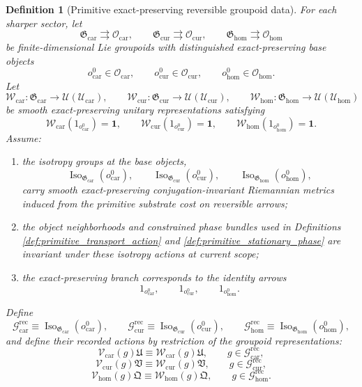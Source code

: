 \documentclass[11pt]{article}
\newcommand{\RootTensorClass}{\mathscr U_{\mathrm{car}}}
\newcommand{\RootRelabelClass}{\mathscr U_{\mathrm{cur}}}
\newcommand{\RootFreeClass}{\mathscr U_{\mathrm{hom}}}
\newcommand{\RootTensor}{\mathfrak U}
\newcommand{\RootRelabel}{\mathfrak V}
\newcommand{\RootFree}{\mathfrak Q}
\newcommand{\TensorReconGroup}{\mathcal G_{\mathrm{car}}^{\mathrm{rec}}}
\newcommand{\CurReconGroup}{\mathcal G_{\mathrm{cur}}^{\mathrm{rec}}}
\newcommand{\HomReconGroup}{\mathcal G_{\mathrm{hom}}^{\mathrm{rec}}}
\newcommand{\TensorReconAct}{\mathscr V_{\mathrm{car}}}
\newcommand{\CurReconAct}{\mathscr V_{\mathrm{cur}}}
\newcommand{\HomReconAct}{\mathscr V_{\mathrm{hom}}}
\newcommand{\TensorGroupoid}{\mathfrak G_{\mathrm{car}}}
\newcommand{\CurGroupoid}{\mathfrak G_{\mathrm{cur}}}
\newcommand{\HomGroupoid}{\mathfrak G_{\mathrm{hom}}}
\newcommand{\TensorObjClass}{\mathcal O_{\mathrm{car}}}
\newcommand{\CurObjClass}{\mathcal O_{\mathrm{cur}}}
\newcommand{\HomObjClass}{\mathcal O_{\mathrm{hom}}}
\newcommand{\TensorObjBase}{o_{\mathrm{car}}^0}
\newcommand{\CurObjBase}{o_{\mathrm{cur}}^0}
\newcommand{\HomObjBase}{o_{\mathrm{hom}}^0}
\newcommand{\TensorGroupoidRep}{\mathscr W_{\mathrm{car}}}
\newcommand{\CurGroupoidRep}{\mathscr W_{\mathrm{cur}}}
\newcommand{\HomGroupoidRep}{\mathscr W_{\mathrm{hom}}}
\newcommand{\Iso}{\operatorname{Iso}}
\newtheorem{definition}{Definition}
\begin{document}
\begin{definition}[Primitive exact-preserving reversible groupoid data]
\label{def:primitive_groupoid}
For each sharper sector, let
\[
\TensorGroupoid\rightrightarrows\TensorObjClass,\qquad
\CurGroupoid\rightrightarrows\CurObjClass,\qquad
\HomGroupoid\rightrightarrows\HomObjClass
\]
be finite-dimensional Lie groupoids with distinguished exact-preserving base objects
\[
\TensorObjBase\in\TensorObjClass,\qquad
\CurObjBase\in\CurObjClass,\qquad
\HomObjBase\in\HomObjClass.
\]
Let
\[
\TensorGroupoidRep:\TensorGroupoid\to\mathcal U(\RootTensorClass),\qquad
\CurGroupoidRep:\CurGroupoid\to\mathcal U(\RootRelabelClass),\qquad
\HomGroupoidRep:\HomGroupoid\to\mathcal U(\RootFreeClass)
\]
be smooth exact-preserving unitary representations satisfying
\[
\TensorGroupoidRep(1_{\TensorObjBase})=\mathbf 1,\qquad
\CurGroupoidRep(1_{\CurObjBase})=\mathbf 1,\qquad
\HomGroupoidRep(1_{\HomObjBase})=\mathbf 1.
\]
Assume:
\begin{enumerate}
    \item the isotropy groups at the base objects,
    \[
    \Iso_{\TensorGroupoid}(\TensorObjBase),\qquad
    \Iso_{\CurGroupoid}(\CurObjBase),\qquad
    \Iso_{\HomGroupoid}(\HomObjBase),
    \]
    carry smooth exact-preserving conjugation-invariant Riemannian metrics induced from the primitive substrate cost on reversible arrows;
    \item the object neighborhoods and constrained phase bundles used in Definitions \ref{def:primitive_transport_action} and \ref{def:primitive_stationary_phase} are invariant under these isotropy actions at current scope;
    \item the exact-preserving branch corresponds to the identity arrows
    \[
    1_{\TensorObjBase},\qquad
    1_{\CurObjBase},\qquad
    1_{\HomObjBase}.
    \]
\end{enumerate}
Define
\begin{equation}
\TensorReconGroup\equiv\Iso_{\TensorGroupoid}(\TensorObjBase),\qquad
\CurReconGroup\equiv\Iso_{\CurGroupoid}(\CurObjBase),\qquad
\HomReconGroup\equiv\Iso_{\HomGroupoid}(\HomObjBase),
\label{eq:recon_from_groupoid}
\end{equation}
and define their recorded actions by restriction of the groupoid representations:
\begin{equation}
\TensorReconAct(g)\RootTensor\equiv\TensorGroupoidRep(g)\RootTensor,
\qquad
g\in\TensorReconGroup,
\label{eq:recon_action_from_groupoid_car}
\end{equation}
\begin{equation}
\CurReconAct(g)\RootRelabel\equiv\CurGroupoidRep(g)\RootRelabel,
\qquad
g\in\CurReconGroup,
\label{eq:recon_action_from_groupoid_cur}
\end{equation}
\begin{equation}
\HomReconAct(g)\RootFree\equiv\HomGroupoidRep(g)\RootFree,
\qquad
g\in\HomReconGroup.
\label{eq:recon_action_from_groupoid_hom}
\end{equation}
\end{definition}
\end{document}
